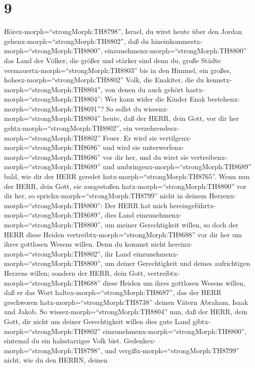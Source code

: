 \hypertarget{section-8}{%
\section{9}\label{section-8}}

 Hörex-morph=``strongMorph:TH8798'', Israel, du wirst heute
über den Jordan gehenx-morph=``strongMorph:TH8802'', daß du
hineinkommestx-morph=``strongMorph:TH8800'',
einzunehmenx-morph=``strongMorph:TH8800'' das Land der Völker, die
größer und stärker sind denn du, große Städte
vermauertx-morph=``strongMorph:TH8803'' bis in den Himmel, 
ein großes, hohesx-morph=``strongMorph:TH8802'' Volk, die Enakiter, die
du kennstx-morph=``strongMorph:TH8804'', von denen du auch gehört
hastx-morph=``strongMorph:TH8804'': Wer kann wider die Kinder Enak
bestehenx-morph=``strongMorph:TH8691''?  So sollst du
wissenx-morph=``strongMorph:TH8804'' heute, daß der HERR, dein Gott, vor
dir her gehtx-morph=``strongMorph:TH8802'', ein
verzehrendesx-morph=``strongMorph:TH8802'' Feuer. Er wird sie
vertilgenx-morph=``strongMorph:TH8686'' und wird sie
unterwerfenx-morph=``strongMorph:TH8686'' vor dir her, und du wirst sie
vertreibenx-morph=``strongMorph:TH8689'' und
umbringenx-morph=``strongMorph:TH8689'' bald, wie dir der HERR geredet
hatx-morph=``strongMorph:TH8765''.  Wenn nun der HERR, dein
Gott, sie ausgestoßen hatx-morph=``strongMorph:TH8800'' vor dir her, so
sprichx-morph=``strongMorph:TH8799'' nicht in deinem
Herzenx-morph=``strongMorph:TH8800'': Der HERR hat mich
hereingeführtx-morph=``strongMorph:TH8689'', dies Land
einzunehmenx-morph=``strongMorph:TH8800'', um meiner Gerechtigkeit
willen, so doch der HERR diese Heiden
vertreibtx-morph=``strongMorph:TH8688'' vor dir her um ihres gottlosen
Wesens willen.  Denn du kommst nicht
hereinx-morph=``strongMorph:TH8802'', ihr Land
einzunehmenx-morph=``strongMorph:TH8800'', um deiner Gerechtigkeit und
deines aufrichtigen Herzens willen; sondern der HERR, dein Gott,
vertreibtx-morph=``strongMorph:TH8688'' diese Heiden um ihres gottlosen
Wesens willen, daß er das Wort haltex-morph=``strongMorph:TH8687'', das
der HERR geschworen hatx-morph=``strongMorph:TH8738'' deinen Vätern
Abraham, Isaak und Jakob.  So
wissex-morph=``strongMorph:TH8804'' nun, daß der HERR, dein Gott, dir
nicht um deiner Gerechtigkeit willen dies gute Land
gibtx-morph=``strongMorph:TH8802''
einzunehmenx-morph=``strongMorph:TH8800'', sintemal du ein halsstarriges
Volk bist.  Gedenkex-morph=``strongMorph:TH8798'', und
vergißx-morph=``strongMorph:TH8799'' nicht, wie du den HERRN, deinen
